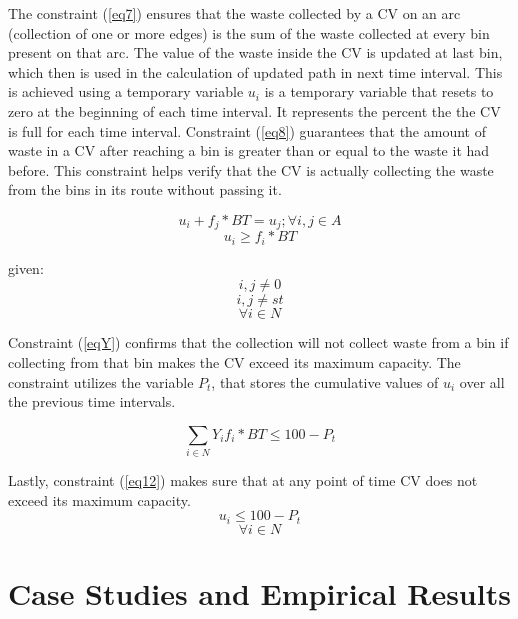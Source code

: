 \documentclass[12pt]{article}
\begin{document}
The constraint (\eqref{eq7}) ensures that the waste collected by a CV on an arc (collection of one or more edges) is the sum of the waste collected at every bin present on that arc. The value of the waste inside the CV is updated at last bin, which then is used in the calculation of updated path in next time interval. This is achieved using a temporary variable $u_i$ is a temporary variable that resets to zero at the beginning of each time interval. It represents the percent the the CV is full for each time interval. Constraint (\eqref{eq8}) guarantees that the amount of waste in a CV after reaching a bin is greater than or equal to the waste it had before. This constraint helps verify that the CV is actually collecting the waste from the bins in its route without passing it. 


\begin{equation}\label{eq7}
    u_i+f_j*BT =u_j ; \forall i,j \in A 
\end{equation}
\begin{equation}\label{eq8}
    u_i\ge f_i*BT
\end{equation}

given: 
$$ i,j\ne 0$$
$$ i,j \ne st $$
$$  \forall i\in N$$

Constraint (\eqref{eqY}) confirms that the collection will not collect waste from a bin if collecting from that bin makes the CV exceed its maximum capacity. The constraint utilizes the variable $P_t$, that stores the cumulative values of $u_i$ over all the previous time intervals.

\begin{equation}\label{eqY}
	\sum_{i\in N}Y_i f_i* BT\le100-P_t
\end{equation}


Lastly, constraint (\eqref{eq12}) makes sure that at any point of time CV does not exceed its maximum capacity. 
\begin{equation}\label{eq12}
    u_i\le 100 - P_t
\end{equation}
$$\forall i \in N $$



\section{Case Studies and Empirical Results}
\end{document}
